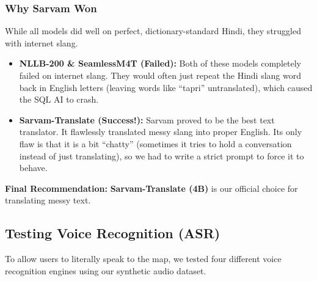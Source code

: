 \documentclass[11pt,a4paper]{article}
\begin{document}
\subsubsection{Why Sarvam Won}
While all models did well on perfect, dictionary-standard Hindi, they struggled with internet slang.
\begin{itemize}
    \item \textbf{NLLB-200 \& SeamlessM4T (Failed):} Both of these models completely failed on internet slang. They would often just repeat the Hindi slang word back in English letters (leaving words like ``tapri'' untranslated), which caused the SQL AI to crash.
    \item \textbf{Sarvam-Translate (Success!):} Sarvam proved to be the best text translator. It flawlessly translated messy slang into proper English. Its only flaw is that it is a bit ``chatty'' (sometimes it tries to hold a conversation instead of just translating), so we had to write a strict prompt to force it to behave.
\end{itemize}

\textbf{Final Recommendation:} \textbf{Sarvam-Translate (4B)} is our official choice for translating messy text.

\subsection{Testing Voice Recognition (ASR)}
To allow users to literally speak to the map, we tested four different voice recognition engines using our synthetic audio dataset.

\begin{table}[H]
\centering
{}
\caption{ASR Performance on Multilingual Spatial Audio}
\end{table}
\end{document}
